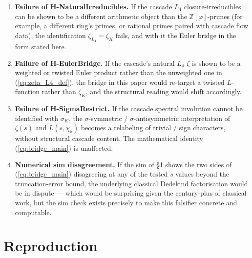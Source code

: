 \documentclass[11pt,a4paper]{article}
\theoremstyle{definition}
\theoremstyle{remark}
\begin{document}
\begin{enumerate}
\item \textbf{Failure of H-NaturalIrreducibles.} If the cascade $L_4$
      closure-irreducibles can be shown to be a different arithmetic
      object than the $\mathbb{Z}[\varphi]$-primes (for example, a
      different ring's primes, or rational primes paired with cascade
      flow data), the identification $\zeta_{L_4} = \zeta_K$ fails, and
      with it the Euler bridge in the form stated here.
\item \textbf{Failure of H-EulerBridge.} If the cascade's natural $L_4$
      $\zeta$ is shown to be a weighted or twisted Euler product rather
      than the unweighted one in (\ref{eq:zeta_L4_def}), the bridge in
      this paper would re-target a twisted $L$-function rather than
      $\zeta_K$, and the structural reading would shift accordingly.
\item \textbf{Failure of H-SigmaRestrict.} If the cascade spectral
      involution cannot be identified with $\sigma_K$, the
      $\sigma$-symmetric / $\sigma$-antisymmetric interpretation of
      $\zeta(s)$ and $L(s, \chi_5)$ becomes a relabeling of trivial /
      sign characters, without structural cascade content. The
      mathematical identity (\ref{eq:bridge_main}) is unaffected.
\item \textbf{Numerical sim disagreement.} If the sim of
      \S\ref{sec:reproduction} shows the two sides of
      (\ref{eq:bridge_main}) disagreeing at any of the tested $s$ values
      beyond the truncation-error bound, the underlying classical
      Dedekind factorisation would be in dispute --- which would be
      surprising given the century-plus of classical work, but the sim
      check exists precisely to make this falsifier concrete and
      computable.
\end{enumerate}

\section{Reproduction}\label{sec:reproduction}
\end{document}
